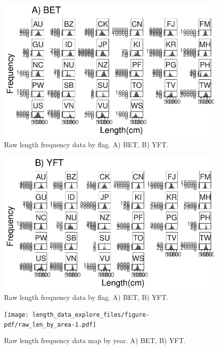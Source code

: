 \documentclass[
  letterpaper,
  DIV=11,
  numbers=noendperiod]{scrartcl}
\begin{document}
\begin{figure}

{\centering \includegraphics{length_data_explore_files/figure-pdf/raw_len_by_flag-1.pdf}

}

\caption{Raw length frequency data by flag. A) BET, B) YFT.}

\end{figure}

\begin{figure}

{\centering \includegraphics{length_data_explore_files/figure-pdf/raw_len_by_flag-2.pdf}

}

\caption{Raw length frequency data by flag. A) BET, B) YFT.}

\end{figure}

\begin{figure}

{\centering \texttt{[image: length\_data\_explore\_files/figure-pdf/raw\_len\_by\_area-1.pdf]}

}

\caption{Raw length frequency data map by year. A) BET, B) YFT.}

\end{figure}
\end{document}
